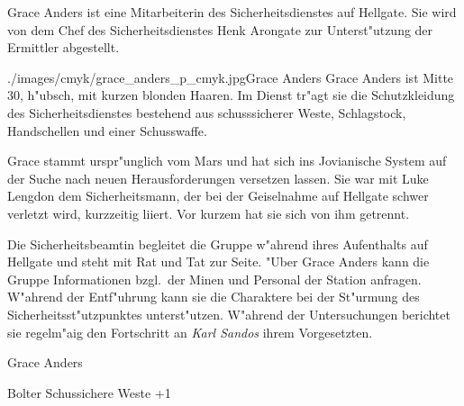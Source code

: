 
Grace Anders ist eine Mitarbeiterin des Sicherheitsdienstes auf Hellgate. Sie wird von dem Chef des Sicherheitsdienstes 
Henk Arongate zur Unterst"utzung der Ermittler abgestellt. 

\begin{sideimagebox}[l]{0.5}{./images/cmyk/grace_anders_p_cmyk.jpg}{Grace Anders}
    Grace Anders ist Mitte 30, h"ubsch, mit kurzen blonden Haaren. Im Dienst tr"agt sie die Schutzkleidung des Sicherheitsdienstes bestehend aus schusssicherer Weste, Schlagstock, Handschellen und einer Schusswaffe. 

    Grace stammt urspr"unglich vom Mars und hat sich ins Jovianische System auf der Suche nach neuen Herausforderungen 
    versetzen lassen. Sie war mit Luke Lengdon dem Sicherheitsmann, der bei der Geiselnahme auf Hellgate schwer verletzt wird,
    kurzzeitig liiert. Vor kurzem hat sie sich von ihm getrennt.

    Die Sicherheitsbeamtin begleitet die Gruppe w"ahrend ihres Aufenthalts auf Hellgate und steht mit Rat und Tat zur Seite.
    "Uber Grace Anders kann die Gruppe Informationen bzgl.~der Minen und Personal der Station anfragen. W"ahrend der Entf"uhrung 
    kann sie die Charaktere bei der St"urmung des Sicherheitsst"utzpunktes unterst"utzen. W"ahrend der Untersuchungen berichtet 
    sie regelm"a\3ig den Fortschritt an \emph{Karl Sandos} ihrem Vorgesetzten.
\end{sideimagebox}

\begin{nscsheet}{Grace Anders}
    \nscstats[ATT=2,AGG=2,COM=2]
    \nscruler
    \begin{nscinventory}
        \nscitem[Waffen] Bolter
        \nscitem[R"ustung] Schussichere Weste +1
    \end{nscinventory}
\end{nscsheet}

